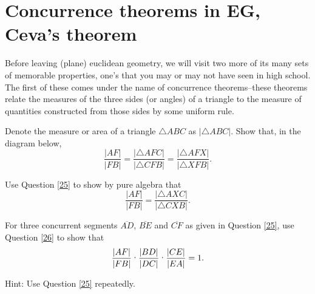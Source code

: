 \documentclass{ximera}
\begin{document}
\section*{Concurrence theorems in \textbf{EG}, Ceva's theorem}

Before leaving (plane) euclidean geometry, we will visit two more of
its many sets of memorable properties, one's that you may or may not
have seen in high school. The first of these comes under the name of
concurrence theorems--these theorems relate the measures of the three
sides (or angles) of a triangle to the measure of quantities
constructed from those sides by some uniform rule.

\begin{question}
\label{25} Denote the measure or area of a triangle $\triangle
ABC$ as $\left\vert \triangle ABC\right\vert $. Show that, in the
diagram below,
\[
\frac{\left\vert AF\right\vert }{\left\vert FB\right\vert }=\frac{\left\vert
\triangle AFC\right\vert }{\left\vert \triangle CFB\right\vert }%
=\frac{\left\vert \triangle AFX\right\vert }{\left\vert \triangle
XFB\right\vert }.
\]
\begin{image}
\end{image}
\end{question}

\begin{question}
\label{26} Use Question \ref{25} to show by pure algebra that%
\begin{equation}
\frac{\left\vert AF\right\vert }{\left\vert FB\right\vert }=\frac{\left\vert
\triangle AXC\right\vert }{\left\vert \triangle CXB\right\vert }. \label{27}%
\end{equation}

\end{question}

\begin{question}
\label{28}  For three concurrent segments $\overline{AD}$,
$\overline{BE}$ and $\overline{CF}$ as given in Question \ref{25}, use
Question \ref{26} to show that%
\[
\frac{\left\vert AF\right\vert }{\left\vert FB\right\vert }%
\text{\textperiodcentered}\frac{\left\vert BD\right\vert }{\left\vert
DC\right\vert }\text{\textperiodcentered}\frac{\left\vert CE\right\vert
}{\left\vert EA\right\vert }=1.
\]


Hint: Use Question \ref{25} repeatedly. 
\end{question}
\end{document}

